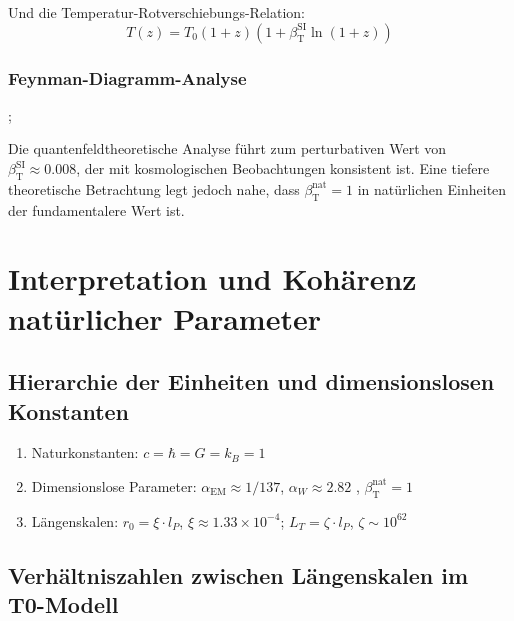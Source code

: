 \documentclass[12pt,a4paper]{article}
\newcommand{\alphaEM}{\alpha_{\text{EM}}}
\newcommand{\betaT}{\beta_{\text{T}}}
\begin{document}
	Und die Temperatur-Rotverschiebungs-Relation:
	\begin{equation}
		T(z) = T_0 (1 + z) (1 + \betaT^{\text{SI}} \ln(1 + z))
	\end{equation}
	
	\subsubsection{Feynman-Diagramm-Analyse}
	
	\begin{center}
		;
	\end{center}
	
	Die quantenfeldtheoretische Analyse führt zum perturbativen Wert von \(\betaT^{\text{SI}} \approx 0.008\), der mit kosmologischen Beobachtungen konsistent ist. Eine tiefere theoretische Betrachtung legt jedoch nahe, dass \(\betaT^{\text{nat}} = 1\) in natürlichen Einheiten der fundamentalere Wert ist.
	
	\section{Interpretation und Kohärenz natürlicher Parameter}
	
	\subsection{Hierarchie der Einheiten und dimensionslosen Konstanten}
	
	\begin{enumerate}
		\item Naturkonstanten: \(c = \hbar = G = k_B = 1\)
		\item Dimensionslose Parameter: \(\alphaEM \approx 1/137\), \(\alpha_W \approx 2.82\) \cite{pascher_temp_2025}, \(\betaT^{\text{nat}} = 1\)
		\item Längenskalen: \(r_0 = \xi \cdot l_P\), \(\xi \approx 1.33 \times 10^{-4}\); \(L_T = \zeta \cdot l_P\), \(\zeta \sim 10^{62}\)
	\end{enumerate}
	
	\subsection{Verhältniszahlen zwischen Längenskalen im T0-Modell}
	
\end{document}
